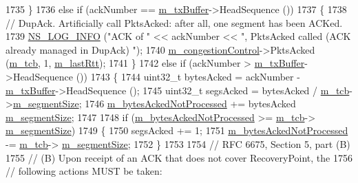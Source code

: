 \begin{DoxyCode}
1735     \}
1736   \textcolor{keywordflow}{else} \textcolor{keywordflow}{if} (ackNumber == \hyperlink{classns3_1_1TcpSocketBase_a4a1b53982ffd851bd07ab8d5005c130e}{m\_txBuffer}->HeadSequence ())
1737     \{
1738       \textcolor{comment}{// DupAck. Artificially call PktsAcked: after all, one segment has been ACKed.}
1739       \hyperlink{group__logging_gafbd73ee2cf9f26b319f49086d8e860fb}{NS\_LOG\_INFO} (\textcolor{stringliteral}{"ACK of "} << ackNumber << \textcolor{stringliteral}{", PktsAcked called (ACK already managed in DupAck)
      "});
1740       \hyperlink{classns3_1_1TcpSocketBase_a090719d52b06a791341e2fefa5e12c3e}{m\_congestionControl}->PktsAcked (\hyperlink{classns3_1_1TcpSocketBase_a26bbaf59001308dc43fb630d76f2e38b}{m\_tcb}, 1, 
      \hyperlink{classns3_1_1TcpSocketBase_a6c48fbea019c593b975bd1d5f5c95dde}{m\_lastRtt});
1741     \}
1742   \textcolor{keywordflow}{else} \textcolor{keywordflow}{if} (ackNumber > \hyperlink{classns3_1_1TcpSocketBase_a4a1b53982ffd851bd07ab8d5005c130e}{m\_txBuffer}->HeadSequence ())
1743     \{
1744       uint32\_t bytesAcked = ackNumber - \hyperlink{classns3_1_1TcpSocketBase_a4a1b53982ffd851bd07ab8d5005c130e}{m\_txBuffer}->HeadSequence ();
1745       uint32\_t segsAcked  = bytesAcked / \hyperlink{classns3_1_1TcpSocketBase_a26bbaf59001308dc43fb630d76f2e38b}{m\_tcb}->\hyperlink{classns3_1_1TcpSocketState_a079872f7b0099ef5f3cab4ff47bd2edd}{m\_segmentSize};
1746       \hyperlink{classns3_1_1TcpSocketBase_a6224a29116682fbbc66f43bcb114239c}{m\_bytesAckedNotProcessed} += bytesAcked %
      \hyperlink{classns3_1_1TcpSocketState_a079872f7b0099ef5f3cab4ff47bd2edd}{m\_segmentSize};
1747 
1748       \textcolor{keywordflow}{if} (\hyperlink{classns3_1_1TcpSocketBase_a6224a29116682fbbc66f43bcb114239c}{m\_bytesAckedNotProcessed} >= \hyperlink{classns3_1_1TcpSocketBase_a26bbaf59001308dc43fb630d76f2e38b}{m\_tcb}->
      \hyperlink{classns3_1_1TcpSocketState_a079872f7b0099ef5f3cab4ff47bd2edd}{m\_segmentSize})
1749         \{
1750           segsAcked += 1;
1751           \hyperlink{classns3_1_1TcpSocketBase_a6224a29116682fbbc66f43bcb114239c}{m\_bytesAckedNotProcessed} -= \hyperlink{classns3_1_1TcpSocketBase_a26bbaf59001308dc43fb630d76f2e38b}{m\_tcb}->
      \hyperlink{classns3_1_1TcpSocketState_a079872f7b0099ef5f3cab4ff47bd2edd}{m\_segmentSize};
1752         \}
1753 
1754       \textcolor{comment}{// RFC 6675, Section 5, part (B)}
1755       \textcolor{comment}{// (B) Upon receipt of an ACK that does not cover RecoveryPoint, the}
1756       \textcolor{comment}{// following actions MUST be taken:}

\end{DoxyCode}
